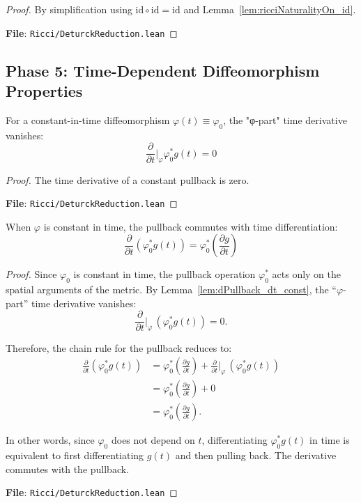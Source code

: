 \begin{proof}
\leanok
{}
By simplification using $\mathrm{id} \circ \mathrm{id} = \mathrm{id}$ and Lemma~\ref{lem:ricciNaturalityOn_id}.

\textbf{File}: \texttt{Ricci/DeturckReduction.lean}
\end{proof}

\subsection{Phase 5: Time-Dependent Diffeomorphism Properties}

\begin{lemma}
\label{lem:dPullback_dt_const}
\leanok
For a constant-in-time diffeomorphism $\varphi(t) \equiv \varphi_0$, the "φ-part" time derivative vanishes:
\[ \frac{\partial}{\partial t}\big|_{\varphi}\varphi_0^* g(t) = 0 \]
\end{lemma}

\begin{proof}
\leanok
{}
The time derivative of a constant pullback is zero.

\textbf{File}: \texttt{Ricci/DeturckReduction.lean}
\end{proof}

\begin{lemma}
\label{lem:pullbackChainRuleOn_const_simplified}
\leanok
When $\varphi$ is constant in time, the pullback commutes with time differentiation:
\[ \frac{\partial}{\partial t}(\varphi_0^* g(t)) = \varphi_0^*\left(\frac{\partial g}{\partial t}\right) \]
\end{lemma}

\begin{proof}
\leanok
{}
Since $\varphi_0$ is constant in time, the pullback operation $\varphi_0^*$ acts only on the spatial arguments of the metric. By Lemma~\ref{lem:dPullback_dt_const}, the ``$\varphi$-part'' time derivative vanishes:
\[
\frac{\partial}{\partial t}\big|_{\varphi}\, (\varphi_0^* g(t)) = 0.
\]

Therefore, the chain rule for the pullback reduces to:
\begin{align*}
\frac{\partial}{\partial t}(\varphi_0^* g(t))
&= \varphi_0^*\left(\frac{\partial g}{\partial t}\right) + \frac{\partial}{\partial t}\big|_{\varphi}\, (\varphi_0^* g(t)) \\
&= \varphi_0^*\left(\frac{\partial g}{\partial t}\right) + 0 \\
&= \varphi_0^*\left(\frac{\partial g}{\partial t}\right).
\end{align*}

In other words, since $\varphi_0$ does not depend on $t$, differentiating $\varphi_0^* g(t)$ in time is equivalent to first differentiating $g(t)$ and then pulling back. The derivative commutes with the pullback.

\textbf{File}: \texttt{Ricci/DeturckReduction.lean}
\end{proof}

